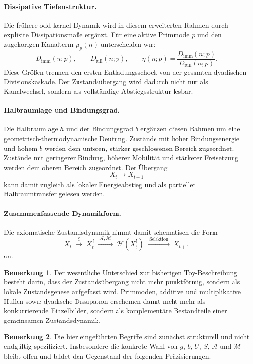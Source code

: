 \documentclass[11pt,a4paper]{article}
\theoremstyle{definition}
\newtheorem{bemerkung}{Bemerkung}
\begin{document}
\paragraph{Dissipative Tiefenstruktur.}
Die frühere odd-kernel-Dynamik wird in diesem erweiterten Rahmen durch explizite Dissipationsmaße ergänzt. Für eine aktive Primmode \(p\) und den zugehörigen Kanalterm \(\mu_p(n)\) unterscheiden wir:
\[
D_{\mathrm{imm}}(n;p),\qquad
D_{\mathrm{full}}(n;p),\qquad
\eta(n;p)=\frac{D_{\mathrm{imm}}(n;p)}{D_{\mathrm{full}}(n;p)}.
\]
Diese Größen trennen den ersten Entladungsschock von der gesamten dyadischen Divisionskaskade. Der Zustandsübergang wird dadurch nicht nur als Kanalwechsel, sondern als vollständige Abstiegsstruktur lesbar.

\paragraph{Halbraumlage und Bindungsgrad.}
Die Halbraumlage \(h\) und der Bindungsgrad \(b\) ergänzen diesen Rahmen um eine geometrisch-thermodynamische Deutung. Zustände mit hoher Bindungsenergie und hohem \(b\) werden dem unteren, stärker geschlossenen Bereich zugeordnet. Zustände mit geringerer Bindung, höherer Mobilität und stärkerer Freisetzung werden dem oberen Bereich zugeordnet. Der Übergang
\[
X_t\longrightarrow X_{t+1}
\]
kann damit zugleich als lokaler Energieabstieg und als partieller Halbraumtransfer gelesen werden.

\paragraph{Zusammenfassende Dynamikform.}
Die axiomatische Zustandsdynamik nimmt damit schematisch die Form
\[
X_t
\;\xrightarrow{\;\mathcal E\;}\;
X_t^\uparrow
\;\xrightarrow{\;\mathcal A,\mathcal M\;}\;
\mathcal H(X_t^\uparrow)
\;\xrightarrow{\;\mathrm{Selektion}\;}\;
X_{t+1}
\]
an.

\begin{bemerkung}
	Der wesentliche Unterschied zur bisherigen Toy-Beschreibung besteht darin, dass der Zustandsübergang nicht mehr punktförmig, sondern als lokale Zustandsgenese aufgefasst wird. Primmoden, additive und multiplikative Hüllen sowie dyadische Dissipation erscheinen damit nicht mehr als konkurrierende Einzelbilder, sondern als komplementäre Bestandteile einer gemeinsamen Zustandsdynamik.
\end{bemerkung}

\begin{bemerkung}
	Die hier eingeführten Begriffe sind zunächst strukturell und nicht endgültig spezifiziert. Insbesondere die konkrete Wahl von \(g\), \(b\), \(U\), \(S\), \(\mathcal A\) und \(\mathcal M\) bleibt offen und bildet den Gegenstand der folgenden Präzisierungen.
\end{bemerkung}
\end{document}
